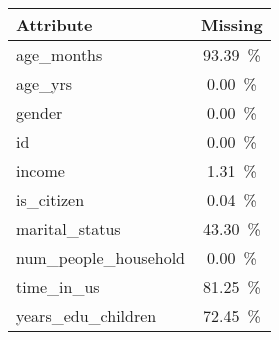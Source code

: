 \begin{tabular}{lS[table-format=2.2]}
\toprule
\textbf{Attribute} &  \textbf{Missing} \\
\midrule
age\_months &      93.39\ \% \\
age\_yrs &       0.00\ \% \\
gender &       0.00\ \% \\
id &       0.00\ \% \\
income &       1.31\ \% \\
is\_citizen &       0.04\ \% \\
marital\_status &      43.30\ \% \\
num\_people\_household &       0.00\ \% \\
time\_in\_us &      81.25\ \% \\
years\_edu\_children &      72.45\ \% \\
\bottomrule
\end{tabular}

